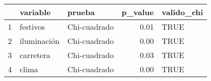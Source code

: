 \begin{table}[ht]
\centering
\begin{tabular}{rllrl}
  \hline
 & variable & prueba & p\_value & valido\_chi \\ 
  \hline
1 & festivos & Chi-cuadrado & 0.01 & TRUE \\ 
  2 & iluminación & Chi-cuadrado & 0.00 & TRUE \\ 
  3 & carretera & Chi-cuadrado & 0.03 & TRUE \\ 
  4 & clima & Chi-cuadrado & 0.00 & TRUE \\ 
   \hline
\end{tabular}
\end{table}
